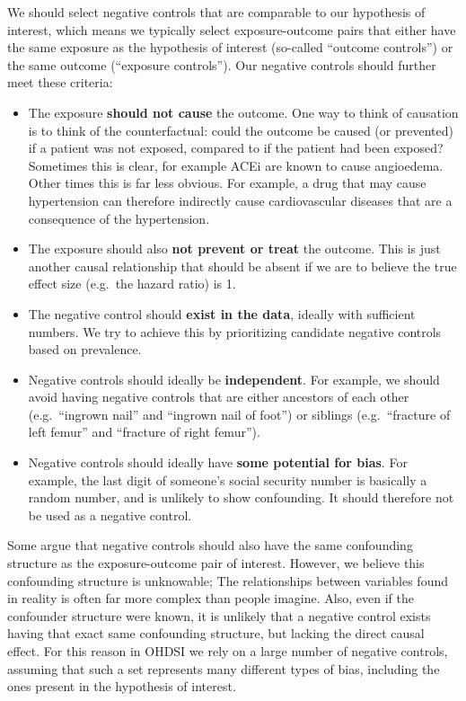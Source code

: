 \documentclass[11pt]{book}
\providecommand{\tightlist}{%
  \setlength{\itemsep}{0pt}\setlength{\parskip}{0pt}}
\theoremstyle{definition}
\theoremstyle{definition}
\theoremstyle{definition}
\theoremstyle{remark}
\begin{document}
We should select negative controls that are comparable to our hypothesis of interest, which means we typically select exposure-outcome pairs that either have the same exposure as the hypothesis of interest (so-called ``outcome controls'') or the same outcome (``exposure controls''). Our negative controls should further meet these criteria:

\begin{itemize}
\tightlist
\item
  The exposure \textbf{should not cause} the outcome. One way to think of causation is to think of the counterfactual: could the outcome be caused (or prevented) if a patient was not exposed, compared to if the patient had been exposed? Sometimes this is clear, for example ACEi are known to cause angioedema. Other times this is far less obvious. For example, a drug that may cause hypertension can therefore indirectly cause cardiovascular diseases that are a consequence of the hypertension.
\item
  The exposure should also \textbf{not prevent or treat} the outcome. This is just another causal relationship that should be absent if we are to believe the true effect size (e.g.~the hazard ratio) is 1.
\item
  The negative control should \textbf{exist in the data}, ideally with sufficient numbers. We try to achieve this by prioritizing candidate negative controls based on prevalence.
\item
  Negative controls should ideally be \textbf{independent}. For example, we should avoid having negative controls that are either ancestors of each other (e.g.~``ingrown nail'' and ``ingrown nail of foot'') or siblings (e.g.~``fracture of left femur'' and ``fracture of right femur'').
\item
  Negative controls should ideally have \textbf{some potential for bias}. For example, the last digit of someone's social security number is basically a random number, and is unlikely to show confounding. It should therefore not be used as a negative control.
\end{itemize}

Some argue that negative controls should also have the same confounding structure as the exposure-outcome pair of interest. \citep{lipsitch_2010} However, we believe this confounding structure is unknowable; The relationships between variables found in reality is often far more complex than people imagine. Also, even if the confounder structure were known, it is unlikely that a negative control exists having that exact same confounding structure, but lacking the direct causal effect. For this reason in OHDSI we rely on a large number of negative controls, assuming that such a set represents many different types of bias, including the ones present in the hypothesis of interest.
\end{document}

